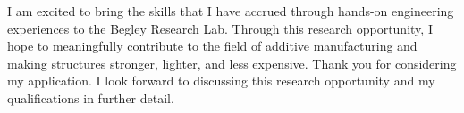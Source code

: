 \documentclass[11pt, letterpaper]{awesome-cv} %
\begin{document}
\begin{cvletter}
I am excited to bring the skills that I have accrued through hands-on engineering experiences to the Begley Research Lab. Through this research opportunity, I hope to meaningfully contribute to the field of additive manufacturing and making structures stronger, lighter, and less expensive. Thank you for considering my application. I look forward to discussing this research opportunity and my qualifications in further detail.


\end{cvletter}


\makeletterclosing %
\end{document}
